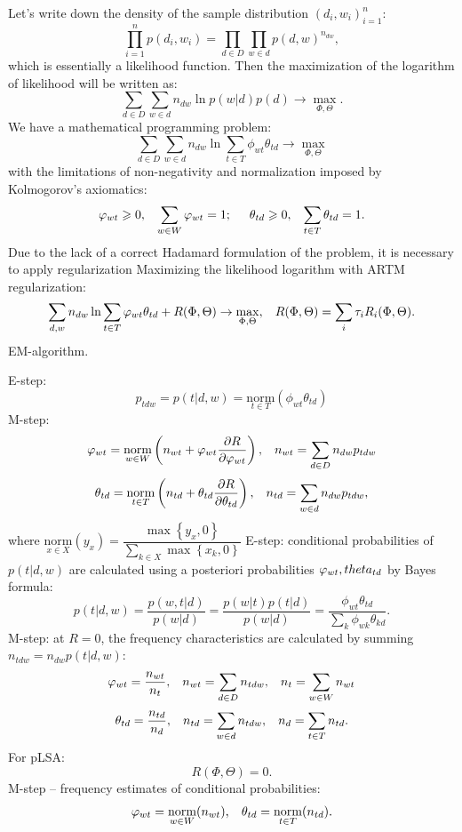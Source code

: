 \documentclass[12pt]{report}
\begin{document}
Let's write down the density of the sample distribution $\left(d_i, w_i\right)_{i=1}^{n}$:
\[\prod_{i=1}^{n} p(d_i, w_i) = \prod_{d\in D} \prod_{w\in d} p(d,w)^{n_{dw}},\]
which is essentially a likelihood function. Then the maximization of the logarithm of likelihood will be written as:
\[\sum\limits_{d\in D}\sum\limits_{w\in d} n_{dw} \ln p(w|d)p(d) \to \max_{\Phi, \Theta}.\]
We have a mathematical programming problem:
\[\sum\limits_{d\in D}\sum\limits_{w\in d} n_{dw} \ln\sum\limits_{t\in T} \phi_{wt}\theta_{td}\to \max_{\Phi, \Theta}\]
with the limitations of non-negativity and normalization imposed by Kolmogorov's axiomatics:
\[\phi_{wt} \geq 0, \hspace*{0.3cm} \sum\limits_{w\in W} \phi_{wt} = 1; \hspace*{0.5cm} \theta_{td} \geq 0, \hspace*{0.3cm} \sum\limits_{t\in T} \theta_{td} = 1.\]
Due to the lack of a correct Hadamard formulation of the problem, it is necessary to apply regularization
Maximizing the likelihood logarithm with ARTM regularization:
\[\sum\limits_{d,w} n_{dw} \ln \sum\limits_{t\in T} \phi_{wt}\theta_{td} + R(\Phi, \Theta) \to \max_{\Phi, \Theta}, \hspace*{0.3cm} R(\Phi, \Theta) = \sum\limits_{i} \tau_i R_i(\Phi, \Theta).\]
EM-algorithm.
\bigskip\par
E-step:
\[p_{tdw} = p(t|d,w) = \underset{t\in T}{\text{norm}}\left(\phi_{wt}\theta_{td}\right)\]
M-step:
\[\phi_{wt} = \underset{w\in W}{\text{norm}} \left(n_{wt} + \phi_{wt}\dfrac{\partial R}{\partial \phi_{wt}}\right), \hspace*{0.3cm} n_{wt} = \sum\limits_{d\in D}n_{dw}p_{tdw}\]
\[\theta_{td} = \underset{t\in T}{\text{norm}} \left(n_{td} + \theta_{td} \dfrac{\partial R}{\partial \theta_{td}}\right), \hspace*{0.3cm} n_{td} = \sum\limits_{w\in d} n_{dw} p_{tdw},\]
where $\underset{x\in X}{\text{norm}} (y_x) =\dfrac{\max\left\{y_x, 0\right\}}{\sum\limits_{k\in X}\max\left\{x_k,0\right\}}$
E-step: conditional probabilities of $p(t|d, w)$ are calculated using a posteriori probabilities $\phi_{wt}, \\theta_{td}$ by Bayes formula:
\[p(t|d,w) = \dfrac{p(w,t|d)}{p(w|d)} = \dfrac{p(w|t)p(t|d)}{p(w|d)} = \dfrac{\phi_{wt}\theta_{td}}{\sum\limits_{k}\phi_{wk}\theta_{kd}}.\]
M-step: at $R = 0$, the frequency characteristics are calculated by summing $n_{tdw} = n_{dw} p(t|d, w)$:
\[\phi_{wt} = \dfrac{n_{wt}}{n_t}, \hspace*{0.3cm} n_{wt} = \sum\limits_{d\in D} n_{tdw}, \hspace*{0.3cm} n_t = \sum\limits_{w\in W} n_{wt}\]
\[\theta_{td} = \dfrac{n_{td}}{n_d}, \hspace*{0.3cm} n_{td} = \sum\limits_{w\in d} n_{tdw}, \hspace*{0.3cm} n_d = \sum\limits_{t\in T} n_{td}.\]
For pLSA:
\[R(\Phi, \Theta) = 0.\]
M-step -- frequency estimates of conditional probabilities:
\[\phi_{wt} = \underset{w\in W}{\text{norm}}(n_{wt}), \hspace*{0.3cm} \theta_{td} = \underset{t\in T}{\text{norm}}(n_{td}).\]
\end{document}
